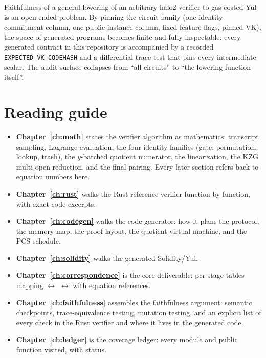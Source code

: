 \begin{remark}
Faithfulness of a general lowering of an arbitrary halo2 verifier to gas-costed
Yul is an open-ended problem. By pinning the circuit family (one identity
commitment column, one public-instance column, fixed feature flags, pinned VK),
the space of generated programs becomes finite and fully inspectable: every
generated contract in this repository is accompanied by a recorded
\texttt{EXPECTED\_\allowbreak{}VK\_\allowbreak{}CODEHASH} and a differential trace test that pins every
intermediate scalar. The audit surface collapses from ``all circuits'' to
``the lowering function itself''.
\end{remark}

\section{Reading guide}
\label{sec:reading}

\begin{itemize}[leftmargin=1.4em,itemsep=2pt]
  \item \textbf{Chapter~\ref{ch:math}} states the verifier algorithm as
        mathematics: transcript sampling, Lagrange evaluation, the four
        identity families (gate, permutation, lookup, trash), the
        $y$-batched quotient numerator, the linearization, the KZG multi-open
        reduction, and the final pairing. Every later section refers back to
        equation numbers here.
  \item \textbf{Chapter~\ref{ch:rust}} walks the Rust reference verifier
        function by function, with exact code excerpts.
  \item \textbf{Chapter~\ref{ch:codegen}} walks the code generator: how it
        plans the protocol, the memory map, the proof layout, the quotient
        virtual machine, and the PCS schedule.
  \item \textbf{Chapter~\ref{ch:solidity}} walks the generated Solidity/\allowbreak{}Yul.
  \item \textbf{Chapter~\ref{ch:correspondence}} is the core deliverable:
        per-stage tables mapping  $\leftrightarrow$ 
        $\leftrightarrow$  with equation references.
  \item \textbf{Chapter~\ref{ch:faithfulness}} assembles the faithfulness
        argument: semantic checkpoints, trace-equivalence testing, mutation
        testing, and an explicit list of every check in the Rust verifier and
        where it lives in the generated code.
  \item \textbf{Chapter~\ref{ch:ledger}} is the coverage ledger: every module
        and public function visited, with status.
\end{itemize}

